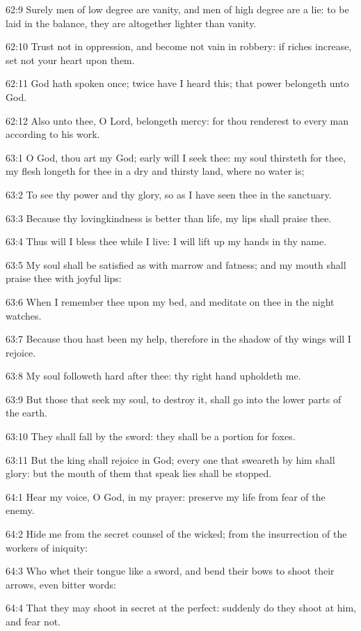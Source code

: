 62:9 Surely men of low degree are vanity, and men of high degree are a
lie: to be laid in the balance, they are altogether lighter than
vanity.

62:10 Trust not in oppression, and become not vain in robbery: if
riches increase, set not your heart upon them.

62:11 God hath spoken once; twice have I heard this; that power
belongeth unto God.

62:12 Also unto thee, O Lord, belongeth mercy: for thou renderest to
every man according to his work.



63:1 O God, thou art my God; early will I seek thee: my soul thirsteth
for thee, my flesh longeth for thee in a dry and thirsty land, where
no water is;

63:2 To see thy power and thy glory, so as I have seen thee in the
sanctuary.

63:3 Because thy lovingkindness is better than life, my lips shall
praise thee.

63:4 Thus will I bless thee while I live: I will lift up my hands in
thy name.

63:5 My soul shall be satisfied as with marrow and fatness; and my
mouth shall praise thee with joyful lips:

63:6 When I remember thee upon my bed, and meditate on thee in the
night watches.

63:7 Because thou hast been my help, therefore in the shadow of thy
wings will I rejoice.

63:8 My soul followeth hard after thee: thy right hand upholdeth me.

63:9 But those that seek my soul, to destroy it, shall go into the
lower parts of the earth.

63:10 They shall fall by the sword: they shall be a portion for foxes.

63:11 But the king shall rejoice in God; every one that sweareth by
him shall glory: but the mouth of them that speak lies shall be
stopped.



64:1 Hear my voice, O God, in my prayer: preserve my life from fear of
the enemy.

64:2 Hide me from the secret counsel of the wicked; from the
insurrection of the workers of iniquity:

64:3 Who whet their tongue like a sword, and bend their bows to shoot
their arrows, even bitter words:

64:4 That they may shoot in secret at the perfect: suddenly do they
shoot at him, and fear not.

